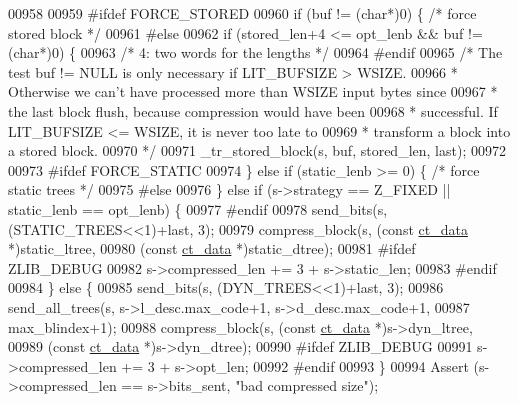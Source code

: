 \begin{DoxyCode}
{{{{{{{{{{{{{{{{{{{{{00958 
00959 \textcolor{preprocessor}{#ifdef FORCE\_STORED}
00960     \textcolor{keywordflow}{if} (buf != (\textcolor{keywordtype}{char}*)0) \{ \textcolor{comment}{/* force stored block */}
00961 \textcolor{preprocessor}{#else}
00962     \textcolor{keywordflow}{if} (stored\_len+4 <= opt\_lenb && buf != (\textcolor{keywordtype}{char}*)0) \{
00963                        \textcolor{comment}{/* 4: two words for the lengths */}
00964 \textcolor{preprocessor}{#endif}
00965         \textcolor{comment}{/* The test buf != NULL is only necessary if LIT\_BUFSIZE > WSIZE.}
00966 \textcolor{comment}{         * Otherwise we can't have processed more than WSIZE input bytes since}
00967 \textcolor{comment}{         * the last block flush, because compression would have been}
00968 \textcolor{comment}{         * successful. If LIT\_BUFSIZE <= WSIZE, it is never too late to}
00969 \textcolor{comment}{         * transform a block into a stored block.}
00970 \textcolor{comment}{         */}
00971         \_tr\_stored\_block(s, buf, stored\_len, last);
00972 
00973 \textcolor{preprocessor}{#ifdef FORCE\_STATIC}
00974     \} \textcolor{keywordflow}{else} \textcolor{keywordflow}{if} (static\_lenb >= 0) \{ \textcolor{comment}{/* force static trees */}
00975 \textcolor{preprocessor}{#else}
00976     \} \textcolor{keywordflow}{else} \textcolor{keywordflow}{if} (s->strategy == Z\_FIXED || static\_lenb == opt\_lenb) \{
00977 \textcolor{preprocessor}{#endif}
00978         send\_bits(s, (STATIC\_TREES<<1)+last, 3);
00979         compress\_block(s, (\textcolor{keyword}{const} \hyperlink{structct__data__s}{ct\_data} *)static\_ltree,
00980                        (\textcolor{keyword}{const} \hyperlink{structct__data__s}{ct\_data} *)static\_dtree);
00981 \textcolor{preprocessor}{#ifdef ZLIB\_DEBUG}
00982         s->compressed\_len += 3 + s->static\_len;
00983 \textcolor{preprocessor}{#endif}
00984     \} \textcolor{keywordflow}{else} \{
00985         send\_bits(s, (DYN\_TREES<<1)+last, 3);
00986         send\_all\_trees(s, s->l\_desc.max\_code+1, s->d\_desc.max\_code+1,
00987                        max\_blindex+1);
00988         compress\_block(s, (\textcolor{keyword}{const} \hyperlink{structct__data__s}{ct\_data} *)s->dyn\_ltree,
00989                        (\textcolor{keyword}{const} \hyperlink{structct__data__s}{ct\_data} *)s->dyn\_dtree);
00990 \textcolor{preprocessor}{#ifdef ZLIB\_DEBUG}
00991         s->compressed\_len += 3 + s->opt\_len;
00992 \textcolor{preprocessor}{#endif}
00993     \}
00994     Assert (s->compressed\_len == s->bits\_sent, \textcolor{stringliteral}{"bad compressed size"});
}}}}}}}}}}}}}}}}}}}}}
\end{DoxyCode}
